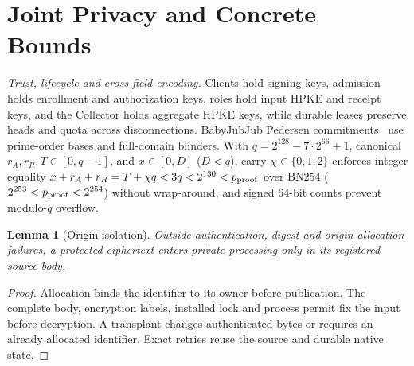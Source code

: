 \documentclass[conference,compsoc]{IEEEtran}
\theoremstyle{definition}
\numberwithin{equation}{section}
\numberwithin{table}{section}
\numberwithin{figure}{section}
\theoremstyle{plain}
\newtheorem{lemma}{Lemma}[section]
\newtheorem{lemma}{Lemma}
\begin{document}
\section{Joint Privacy and Concrete Bounds}
\label{app:native-theory}

\par\noindent\emph{Trust, lifecycle and cross-field encoding.}
\label{app:trust-lifecycle}\label{app:native-interface}
Clients hold signing keys, admission holds enrollment and authorization keys, roles hold input HPKE and receipt keys, and the Collector holds aggregate HPKE keys, while durable leases preserve heads and quota across disconnections. BabyJubJub Pedersen commitments~\cite{Pedersen1991Commitment} use prime-order bases and full-domain blinders. With \(q=2^{128}-7\cdot2^{66}+1\), canonical \(r_A,r_R,T\in[0,q-1]\), and \(x\in[0,D]\) (\(D<q\)), carry \(\chi\in\{0,1,2\}\) enforces integer equality \(x+r_A+r_R=T+\chi q<3q<2^{130}<p_{\rm proof}\) over BN254 (\(2^{253}<p_{\rm proof}<2^{254}\)) without wrap-around, and signed 64-bit counts prevent modulo-\(q\) overflow.

\begin{lemma}[Origin isolation]
\label{lem:origin-isolation}
Outside authentication, digest and origin-allocation failures, a protected
ciphertext enters private processing only in its registered source body.
\end{lemma}
\begin{proof}
Allocation binds the identifier to its owner before publication. The complete
body, encryption labels, installed lock and process permit fix the input before
decryption. A transplant changes authenticated bytes or requires an already
allocated identifier. Exact retries reuse the source and durable native state.
\end{proof}
\end{document}
